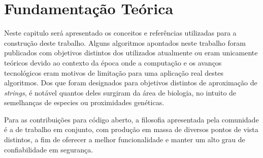 \chapter{Fundamentação Teórica}

Neste capitulo será apresentado os conceitos e referências utilizadas para a construção deste trabalho. Alguns algoritmos apontados neste trabalho foram publicados com objetivos distintos dos utilizados atualmente ou eram unicamente teóricos devido ao contexto da época onde a computação e os avanços tecnológicos eram motivos de limitação para uma aplicação real destes algoritmos. Dos que foram designados para objetivos distintos de aproximação de \textit{strings}, é notável quantos deles surgiram da área de biologia, no intuito de semelhanças de especies ou proximidades genéticas.

Para as contribuições para código aberto, a filosofia apresentada pela comunidade é a de trabalho em conjunto, com  produção em massa de diversos pontos de vista distintos, a fim de oferecer a melhor funcionalidade e manter um alto grau de confiabilidade em segurança.



